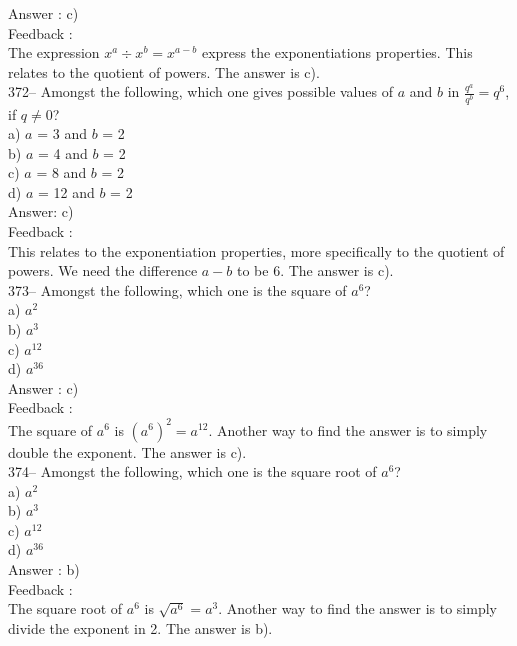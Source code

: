 ﻿\documentclass[letterpaper, 12pt]{article}
\begin{document}
Answer : c)\\

Feedback : \\
The expression $x^{a}\div x^{b}=x^{a-b}$ express the exponentiations properties. 
This relates to the quotient of powers.  
The answer is c).\\


372-- Amongst the following, which one gives possible values of $a$ and $b$ in $\frac{q^a}{q^b}=q^{6}$, if
$q\neq0$?\\
a) $a$ = 3 and $b$ = 2\\
b) $a$ = 4 and $b$ = 2\\
c) $a$ = 8 and $b$ = 2\\
d) $a$ = 12 and $b$ = 2\\

Answer: c)\\

Feedback : \\
This relates to the exponentiation properties, more specifically to the quotient of powers. We need the difference $a-b$ to be 6. 
The answer is c).\\

373-- Amongst the following, which one is the square of $a^{6}$?\\
a) $a^{2}$\\
b) $a^{3}$\\
c) $a^{12}$\\
d) $a^{36}$\\

Answer : c) \\

Feedback : \\
The square of $a^{6}$ is $\left( a^{6}\right)^{2}=a^{12}$.  Another way to find the answer is to simply double the exponent. The answer is c).\\

374-- Amongst the following, which one is the square root of $a^{6}$?\\
a) $a^{2}$\\
b) $a^{3}$\\
c) $a^{12}$\\
d) $a^{36}$\\

Answer : b) \\

Feedback : \\
The square root of $a^{6}$ is $ \sqrt{a^{6}}=a^{3}$.  Another way to find the answer is to simply divide the exponent in 2. The answer is b).\\
\end{document}
